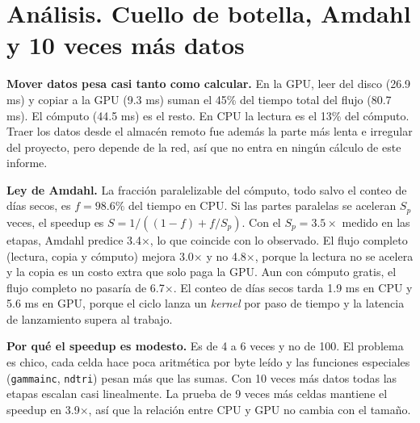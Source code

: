 \documentclass[10pt]{article}
\begin{document}
\section{An\'alisis. Cuello de botella, Amdahl y 10 veces m\'as datos}
\textbf{Mover datos pesa casi tanto como calcular.} En la GPU, leer del disco (26.9 ms) y copiar a la GPU (9.3 ms) suman el 45\% del tiempo total del flujo (80.7 ms). El c\'omputo (44.5 ms) es el resto. En CPU la lectura es el 13\% del c\'omputo. Traer los datos desde el almac\'en remoto fue adem\'as la parte m\'as lenta e irregular del proyecto, pero depende de la red, as\'i que no entra en ning\'un c\'alculo de este informe.

\textbf{Ley de Amdahl.} La fracci\'on paralelizable del c\'omputo, todo salvo el conteo de d\'ias secos, es $f=98.6\%$ del tiempo en CPU. Si las partes paralelas se aceleran $S_p$ veces, el speedup es $S=1/((1-f)+f/S_p)$. Con el $S_p=3.5\times$ medido en las etapas, Amdahl predice 3.4$\times$, lo que coincide con lo observado. El flujo completo (lectura, copia y c\'omputo) mejora 3.0$\times$ y no 4.8$\times$, porque la lectura no se acelera y la copia es un costo extra que solo paga la GPU. Aun con c\'omputo gratis, el flujo completo no pasar\'ia de 6.7$\times$. El conteo de d\'ias secos tarda 1.9 ms en CPU y 5.6 ms en GPU, porque el ciclo lanza un \emph{kernel} por paso de tiempo y la latencia de lanzamiento supera al trabajo.

\textbf{Por qu\'e el speedup es modesto.} Es de 4 a 6 veces y no de 100. El problema es chico, cada celda hace poca aritm\'etica por byte le\'ido y las funciones especiales (\texttt{gammainc}, \texttt{ndtri}) pesan m\'as que las sumas. Con 10 veces m\'as datos todas las etapas escalan casi linealmente. La prueba de 9 veces m\'as celdas mantiene el speedup en 3.9$\times$, as\'i que la relaci\'on entre CPU y GPU no cambia con el tama\~no.
\end{document}
